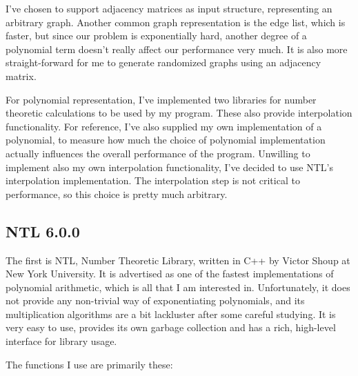 \documentclass[a4paper]{article}
\begin{document}
I've chosen to support adjacency matrices as input structure, representing an arbitrary graph\footnotemark. Another common graph representation is the edge list, which is faster, but since our problem is exponentially hard, another degree of a polynomial term doesn't really affect our performance very much. It is also more straight-forward for me to generate randomized graphs using an adjacency matrix.



For polynomial representation, I've implemented two libraries for number theoretic calculations to be used by my program. These also provide interpolation functionality. For reference, I've also supplied my own implementation of a polynomial, to measure how much the choice of polynomial implementation actually influences the overall performance of the program. Unwilling to implement also my own interpolation functionality, I've decided to use NTL's interpolation implementation. The interpolation step is not critical to performance, so this choice is pretty much arbitrary.


\subsection{NTL 6.0.0}
The first is NTL, Number Theoretic Library, written in C++ by Victor Shoup at New York University\cite{ntl}. It is advertised as one of the fastest implementations of polynomial arithmetic, which is all that I am interested in. Unfortunately, it does not provide any non-trivial way of exponentiating polynomials, and its multiplication algorithms are a bit lackluster after some careful studying. It is very easy to use, provides its own garbage collection and has a rich, high-level interface for library usage.

The functions I use are primarily these: 
\end{document}
